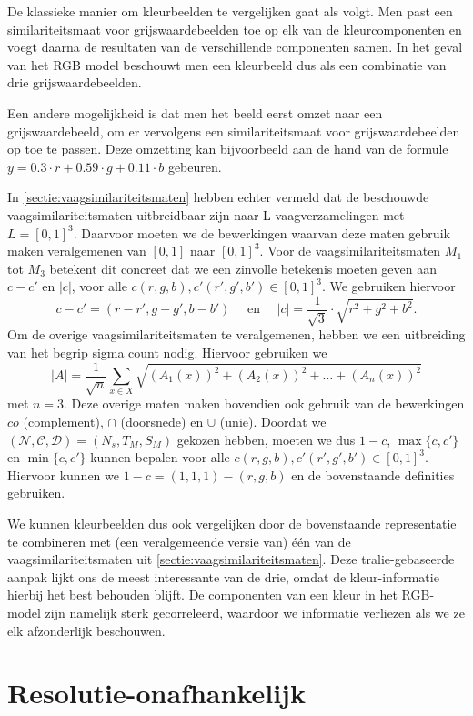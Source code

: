 De klassieke manier om kleurbeelden te vergelijken gaat als volgt. Men past een similariteitsmaat 
voor grijswaardebeelden toe op elk van de kleurcomponenten en voegt daarna de resultaten van de
verschillende componenten samen. In het geval van het RGB model beschouwt men een
kleurbeeld dus als een combinatie van drie grijswaardebeelden. 

Een andere mogelijkheid is dat men het beeld eerst omzet naar een grijswaardebeeld, om er 
vervolgens een similariteitsmaat voor grijswaardebeelden op toe te passen. Deze omzetting kan 
bijvoorbeeld aan de hand van de formule $y = 0.3 \cdot r + 0.59 \cdot g + 0.11 \cdot b$ gebeuren.

In \ref{sectie:vaagsimilariteitsmaten} hebben echter vermeld dat de beschouwde 
vaagsimilariteitsmaten uitbreidbaar zijn naar L-vaag\-ver\-za\-me\-ling\-en met
$L=[0,1]^3$. Daarvoor moeten we de bewerkingen waarvan deze maten gebruik maken veralgemenen van 
$[0,1]$ naar $[0,1]^3$. 
Voor de vaagsimilariteitsmaten $M_1$ tot $M_3$ betekent dit concreet dat we een zinvolle betekenis 
moeten geven aan $c - c'$ en $|c|$, voor alle $c(r,g,b),c'(r',g',b') \in [0,1]^3$. We gebruiken
hiervoor 
$$
c - c' = (r-r',g-g',b-b') \quad \textrm{ en } \quad |c| = \frac{1}{\sqrt{3}} \cdot \sqrt{r^2 + g^2 + b^2}.
$$
Om de overige vaagsimilariteitsmaten te veralgemenen, hebben we een uitbreiding van het
begrip sigma count nodig. Hiervoor gebruiken we
$$
|A|=\frac{1}{\sqrt{n}}\sum_{x \in X}\sqrt{(A_1(x))^2+(A_2(x))^2+\ldots+(A_n(x))^2}
$$
met $n=3$. Deze overige maten maken bovendien ook gebruik van de bewerkingen $co$ (complement), 
$\cap$ (doorsnede) en $\cup$ (unie). Doordat we 
$(\mathcal{N},\mathcal{C},\mathcal{D})=(N_s,T_M,S_M)$ gekozen hebben, moeten we
dus $1 - c$, $\max \{c,c'\}$ en $\min \{c,c'\}$ kunnen bepalen voor alle 
$c(r,g,b),c'(r',g',b') \in [0,1]^3$. Hiervoor kunnen we $1 - c = (1,1,1) - (r,g,b)$ en de
bovenstaande definities gebruiken.

We kunnen kleurbeelden dus ook vergelijken door de bovenstaande representatie 
te combineren met (een veralgemeende versie van) \'e\'en van de 
vaagsimilariteitsmaten uit \ref{sectie:vaagsimilariteitsmaten}. 
Deze tralie-gebaseerde aanpak lijkt ons de meest interessante van de drie, omdat
de kleur-informatie hierbij het best behouden blijft. De componenten van een kleur
in het RGB-model zijn namelijk sterk gecorreleerd, waardoor we informatie verliezen
als we ze elk afzonderlijk beschouwen. 


\section{Resolutie-onafhankelijk}
\label{sectie:res-onafh}

